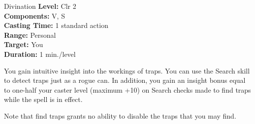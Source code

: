 {Divination}
{
	\textbf{Level:}
	Clr 2\\
	\textbf{Components:}
	V, S\\
	\textbf{Casting Time:}
	1 standard action\\
	\textbf{Range:}
	Personal\\
	\textbf{Target:}
	You\\
	\textbf{Duration:}
	1 min./level\\
}
{
	You gain intuitive insight into the workings of traps. You can use the Search skill to detect traps just as a rogue can. In addition, you gain an insight bonus equal to one-half your caster level (maximum +10) on Search checks made to find traps while the spell is in effect.

	Note that find traps grants no ability to disable the traps that you may find.

}
